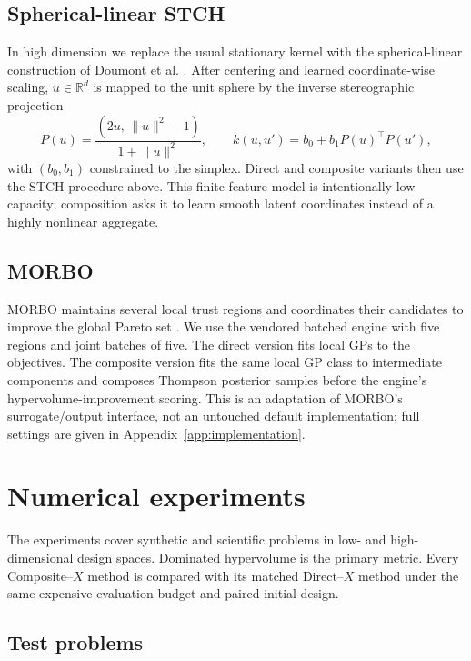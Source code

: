 \documentclass{article}
\newcommand{\R}{\mathbb{R}}
\begin{document}
\subsection{Spherical-linear STCH}
In high dimension we replace the usual stationary kernel with the
spherical-linear construction of Doumont et al. \cite{doumont2026linear}.
After centering and learned coordinate-wise scaling, $u\in\R^d$ is mapped to
the unit sphere by the inverse stereographic projection
\begin{equation}
  P(u)=\frac{(2u,\,\lVert u\rVert^2-1)}{1+\lVert u\rVert^2},
  \qquad
  k(u,u')=b_0+b_1P(u)^\top P(u'),
  \label{eq:spherical}
\end{equation}
with $(b_0,b_1)$ constrained to the simplex.  Direct and composite variants
then use the STCH procedure above.  This finite-feature model is intentionally
low capacity; composition asks it to learn smooth latent coordinates instead
of a highly nonlinear aggregate.

\subsection{MORBO}
MORBO maintains several local trust regions and coordinates their candidates
to improve the global Pareto set \cite{daulton2022morbo}.  We use the vendored
batched engine with five regions and joint batches of five.  The direct version
fits local GPs to the objectives.  The composite version fits the same local GP
class to intermediate components and composes Thompson posterior samples
before the engine's hypervolume-improvement scoring.  This is an adaptation of
MORBO's surrogate/output interface, not an untouched default implementation;
full settings are given in Appendix~\ref{app:implementation}.

\section{Numerical experiments}
\label{sec:experiments}

The experiments cover synthetic and scientific problems in low- and
high-dimensional design spaces.  Dominated hypervolume is the primary metric.
Every Composite--$X$ method is compared with its matched Direct--$X$ method
under the same expensive-evaluation budget and paired initial design.

\subsection{Test problems}
\end{document}
